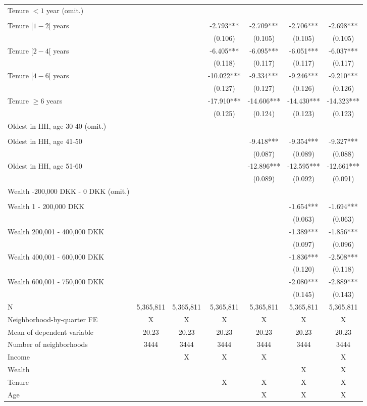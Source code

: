 \begin{tabular}{lcccccc}
 Tenure $<1$ year (omit.) &  &  &  &  &  &  \\ 
 &  &  &  &  &  &  \\ 
Tenure $[1-2[$ years &  &  & -2.793*** & -2.709*** & -2.706*** & -2.698*** \\ 
 &  &  & (0.106) & (0.105) & (0.105) & (0.105) \\ 
Tenure $[2-4[$ years &  &  & -6.405*** & -6.095*** & -6.051*** & -6.037*** \\ 
 &  &  & (0.118) & (0.117) & (0.117) & (0.117) \\ 
Tenure $[4-6[$ years &  &  & -10.022*** & -9.334*** & -9.246*** & -9.210*** \\ 
 &  &  & (0.127) & (0.127) & (0.126) & (0.126) \\ 
Tenure $\geq 6$ years &  &  & -17.910*** & -14.606*** & -14.430*** & -14.323*** \\ 
 &  &  & (0.125) & (0.124) & (0.123) & (0.123) \\ 
Oldest in HH, age 30-40 (omit.) &  &  &  &  &  &  \\ 
 &  &  &  & &  &  \\ 
Oldest in HH, age 41-50 &  &  &  & -9.418*** & -9.354*** & -9.327*** \\ 
 &  &  &  & (0.087) & (0.089) & (0.088) \\ 
Oldest in HH, age 51-60 &  &  &  & -12.896*** & -12.595*** & -12.661*** \\ 
 &  &  &  & (0.089) & (0.092) & (0.091) \\ 
 Wealth -200,000 DKK - 0 DKK (omit.) &  &  &  &  &  &  \\ 
 &  &  &  &  &  &  \\ 
Wealth 1 - 200,000 DKK &  &  &  &  & -1.654*** & -1.694*** \\ 
 &  &  &  &  & (0.063) & (0.063) \\ 
Wealth 200,001 - 400,000 DKK &  &  &  &  & -1.389*** & -1.856*** \\ 
 &  &  &  &  & (0.097) & (0.096) \\ 
Wealth 400,001 - 600,000 DKK &  &  &  &  & -1.836*** & -2.508*** \\ 
 &  &  &  &  & (0.120) & (0.118) \\ 
Wealth 600,001 - 750,000 DKK &  &  &  &  & -2.080*** & -2.889*** \\ 
 &  &  &  &  & (0.145) & (0.143) \\ 
 \midrule
N & 5,365,811 & 5,365,811 & 5,365,811 & 5,365,811 & 5,365,811 & 5,365,811 \\ 
Neighborhood-by-quarter FE & X & X & X & X & X & X \\ 
Mean of dependent variable & 20.23 & 20.23 & 20.23 & 20.23 & 20.23 & 20.23 \\ 
Number of neighborhoods & 3444 & 3444 & 3444 & 3444 & 3444 & 3444 \\ 
Income &  & X & X & X &  & X \\ 
Wealth &  &  &  &  & X & X \\ 
Tenure &  &  & X & X & X & X \\ 
Age &  &  &  & X & X & X \\ 
\bottomrule
\end{tabular}
